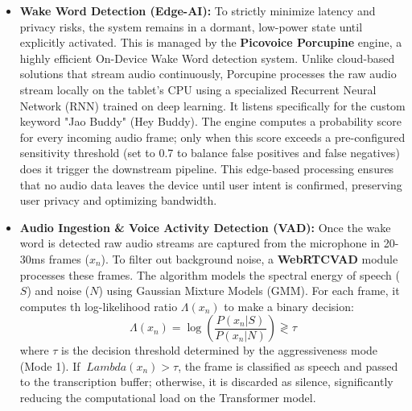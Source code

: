 \begin{itemize}
    \item \textbf{Wake Word Detection (Edge-AI):} To strictly minimize latency and privacy risks, the system remains in a dormant, low-power state until explicitly activated. This is managed by the \textbf{Picovoice Porcupine} engine, a highly efficient On-Device Wake Word detection system. Unlike cloud-based solutions that stream audio continuously, Porcupine processes the raw audio stream locally on the tablet's CPU using a specialized Recurrent Neural Network (RNN) trained on deep learning. It listens specifically for the custom keyword "Jao Buddy" (Hey Buddy). The engine computes a probability score for every incoming audio frame; only when this score exceeds a pre-configured sensitivity threshold (set to 0.7 to balance false positives and false negatives) does it trigger the downstream pipeline. This edge-based processing ensures that no audio data leaves the device until user intent is confirmed, preserving user privacy and optimizing bandwidth.
	\item \textbf{Audio Ingestion \& Voice Activity Detection (VAD):} Once the wake word is detected
	raw
	audio streams are captured from the microphone in 20-30ms frames ($x_n$). To filter out background 
	noise, a \textbf{WebRTCVAD} module processes these frames. The algorithm models the spectral energy
	of speech ($S$) and noise ($N$) using Gaussian Mixture Models (GMM). For each frame, it computes th
	log-likelihood ratio $\Lambda(x_n)$ to make a binary decision:
	\begin{equation}
	\Lambda(x_n) = \log \left( \frac{P(x_n | S)}{P(x_n | N)} \right) \gtrless \tau
	\end{equation}
	where $\tau$ is the decision threshold determined by the aggressiveness mode (Mode 1). If $\
	Lambda(x_n) > \tau$, the frame is classified as speech and passed to the transcription buffer; 
	otherwise, it is discarded as silence, significantly reducing the computational load on the 
	Transformer model.
	

\end{itemize}
